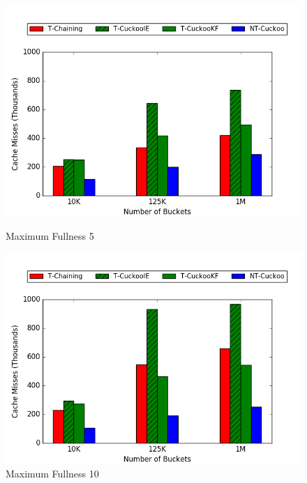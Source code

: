 \begin{figure}[H]
    \centering
    \begin{minipage}{.5\textwidth}
    \centering
        \includegraphics[width=\linewidth]{maps/335cm.png}
        \caption*{Maximum Fullness 5}
    \end{minipage}
    \begin{minipage}{.5\textwidth}
    \centering
        \includegraphics[width=\linewidth]{maps/3310cm.png}
        \caption*{Maximum Fullness 10}
    \end{minipage}
    \begin{minipage}{.5\textwidth}
    \centering

\end{minipage}
\end{figure}
